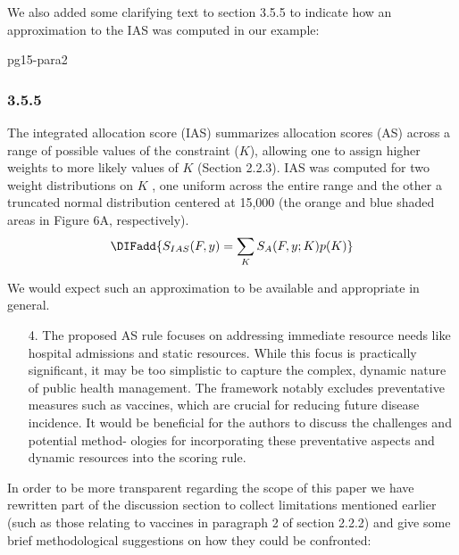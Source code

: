 \documentclass{article}
\begin{document}
We also added some clarifying text to section 3.5.5 to indicate how an approximation to the IAS was computed in our example:

\begin{mybox}{pg15-para2}
  \DIFaddbegin \subsubsection*{3.5.5 \quad {}}
  \label{sec:ias_examp}

  \DIFaddend The integrated allocation score (IAS) summarizes allocation scores (AS) across a range of possible values of the
  constraint ($K$), allowing one to assign higher weights to more likely values of $K$ (Section
 2.2.3). 
  IAS was computed for two weight distributions on \DIFaddbegin {}\DIFaddend $K$ \DIFaddbegin {}\DIFaddend ,
  one uniform across the entire range and the other \DIFaddbegin {}\DIFaddend a truncated normal distribution centered at 15,000
  (the orange and blue shaded areas in Figure
  6A, respectively).
  \DIFaddbegin {}$$\DIFadd{S_{IAS}(F, y) = \sum_K S_A(F,y; K) p(K)}$$

  \DIFaddend 

\end{mybox}
We would expect such an approximation to be available and appropriate in general.

\begin{quotebar}
\begin{enumerate}
  \item[4.] The proposed AS rule focuses on addressing immediate resource needs like hospital admissions and static resources. While this focus is practically significant, it may be too simplistic to capture the complex, dynamic nature of public health management. The framework notably excludes preventative measures such as vaccines, which are crucial for reducing future disease incidence. It would be beneficial for the authors to discuss the challenges and potential method- ologies for incorporating these preventative aspects and dynamic resources into the scoring rule.
\end{enumerate}
\end{quotebar}

In order to be more transparent regarding the scope of this paper we have rewritten part of the discussion section to collect limitations mentioned earlier 
(such as those relating to vaccines in paragraph 2 of section 2.2.2) and give some brief methodological suggestions on how they could be confronted:
\end{document}
